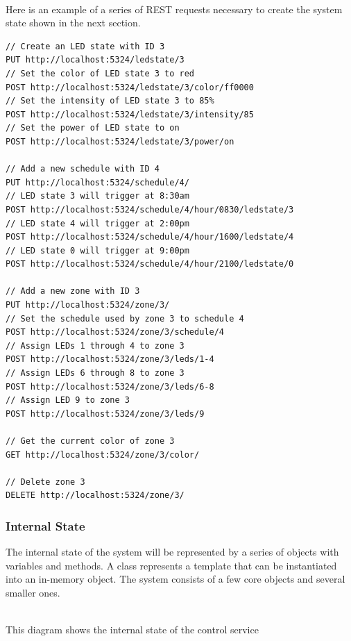 \documentclass[onecolumn, draftclsnofoot,10pt, compsoc]{IEEEtran}
\begin{document}
			\noindent \\Here is an example of a series of REST requests necessary to create the system state shown in the next section.
			\begin{lstlisting}[language=XML]
// Create an LED state with ID 3
PUT http://localhost:5324/ledstate/3
// Set the color of LED state 3 to red
POST http://localhost:5324/ledstate/3/color/ff0000
// Set the intensity of LED state 3 to 85%
POST http://localhost:5324/ledstate/3/intensity/85
// Set the power of LED state to on
POST http://localhost:5324/ledstate/3/power/on

// Add a new schedule with ID 4
PUT http://localhost:5324/schedule/4/
// LED state 3 will trigger at 8:30am
POST http://localhost:5324/schedule/4/hour/0830/ledstate/3
// LED state 4 will trigger at 2:00pm
POST http://localhost:5324/schedule/4/hour/1600/ledstate/4
// LED state 0 will trigger at 9:00pm
POST http://localhost:5324/schedule/4/hour/2100/ledstate/0

// Add a new zone with ID 3
PUT http://localhost:5324/zone/3/
// Set the schedule used by zone 3 to schedule 4
POST http://localhost:5324/zone/3/schedule/4
// Assign LEDs 1 through 4 to zone 3
POST http://localhost:5324/zone/3/leds/1-4
// Assign LEDs 6 through 8 to zone 3
POST http://localhost:5324/zone/3/leds/6-8
// Assign LED 9 to zone 3
POST http://localhost:5324/zone/3/leds/9

// Get the current color of zone 3
GET http://localhost:5324/zone/3/color/

// Delete zone 3
DELETE http://localhost:5324/zone/3/
\end{lstlisting}

			\subsubsection{Internal State}
			The internal state of the system will be represented by a series of objects with variables and methods.
			A class represents a template that can be instantiated into an in-memory object.
			The system consists of a few core objects and several smaller ones.

			\noindent \\This diagram shows the internal state of the control service
\end{document}
